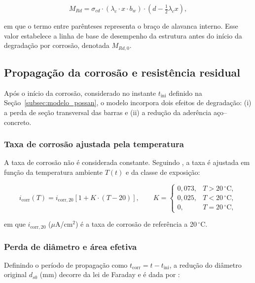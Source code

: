 \begin{equation}\label{eq:mrd_lim_resumida}
M_{Rd} = \sigma_{cd} \cdot (\lambda_c \cdot x \cdot b_w) \cdot \left(d - \tfrac{1}{2} \lambda_c x\right),
\end{equation}

\noindent em que o termo entre parênteses representa o braço de alavanca interno. Esse valor estabelece a linha de base de desempenho da estrutura antes do início da degradação por corrosão, denotada $M_{Rd,0}$.

\subsection{Propagação da corrosão e resistência residual}
\label{subsec:residual}

Após o início da corrosão, considerado no instante $t_{\mathrm{ini}}$ definido na Seção~\ref{subsec:modelo_possan}, o modelo incorpora dois efeitos de degradação: (i) a perda de seção transversal das barras e (ii) a redução da aderência aço--concreto.

\subsubsection{Taxa de corrosão ajustada pela temperatura}

A taxa de corrosão não é considerada constante. Seguindo \citet{peng2016}, a taxa é ajustada em função da temperatura ambiente $T(t)$ e da classe de exposição:

\begin{equation}\label{eq:i_cor_t}
i_{\mathrm{corr}}(T) = i_{\mathrm{corr},20} \left[ 1 + K \cdot (T - 20) \right],
\qquad
K =
\begin{cases}
0{,}073, & T > 20\,^\circ\mathrm{C}, \\
0{,}025, & T < 20\,^\circ\mathrm{C}, \\
0, & T = 20\,^\circ\mathrm{C},
\end{cases}
\end{equation}

\noindent em que $i_{\mathrm{corr},20}$ ($\mu$A/cm$^2$) é a taxa de corrosão de referência a 20\,$^\circ$C.

\subsubsection{Perda de diâmetro e área efetiva}

Definindo o período de propagação como $t_{\mathrm{corr}} = t - t_{\mathrm{ini}}$, a redução do diâmetro original $d_{s0}$ (mm) decorre da lei de Faraday e é dada por \citep{val1997, azad2010}:


